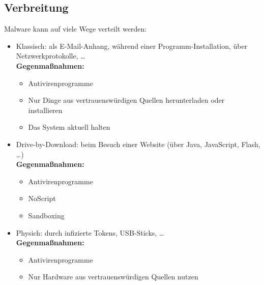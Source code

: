\documentclass[a4paper, 11pt, accentcolor = tud3b]{tudreport}
\begin{document}
            \subsection{Verbreitung}
                Malware kann auf viele Wege verteilt werden:
                \begin{itemize}
                	\item Klassisch: als E-Mail-Anhang, während einer Programm-Installation, über Netzwerkprotokolle, \dots \\ \textbf{Gegenmaßnahmen:}
                	    \begin{itemize}
                	    	\item Antivirenprogramme
                	    	\item Nur Dinge aus vertrauenswürdigen Quellen herunterladen oder installieren
                	    	\item Das System aktuell halten
                	    \end{itemize}
                    \item Drive-by-Download: beim Besuch einer Website (über Java, JavaScript, Flash, \dots) \\ \textbf{Gegenmaßnahmen:}
	                    \begin{itemize}
	                    	\item Antivirenprogramme
	                    	\item NoScript
	                    	\item Sandboxing
	                    \end{itemize}
                    \item Physich: durch infizierte Tokens, USB-Sticks, \dots \\ \textbf{Gegenmaßnahmen:}
	                    \begin{itemize}
	                    	\item Antivirenprogramme
	                    	\item Nur Hardware aus vertrauenswürdigen Quellen nutzen
	                    \end{itemize}
                \end{itemize}
\end{document}
